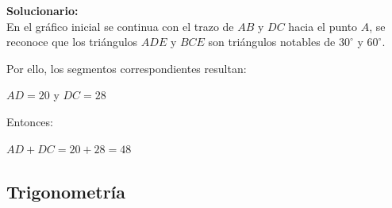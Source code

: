 \begin{enumerate}
	\vspace{2mm}
	\textbf{Solucionario:}\\

	En el gráfico inicial se continua con el trazo de $AB$ y $DC$ hacia el punto $A$, se reconoce que los triángulos $ADE$ y $BCE$ son triángulos notables de $30^\circ$ y $60^\circ$.
	
	Por ello, los segmentos correspondientes resultan:
	
	$AD=20$
	\qquad y \qquad
	$DC=28$
	
	Entonces:
	
	$AD+DC=20+28=48$
	
	
	\vspace{6mm}
	
\end{enumerate}

\subsection*{Trigonometría}

